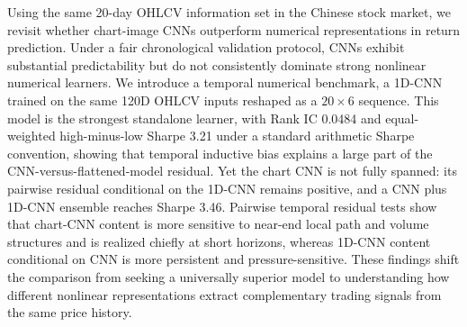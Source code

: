 Using the same 20-day OHLCV information set in the Chinese stock market, we revisit whether chart-image CNNs outperform numerical representations in return prediction. Under a fair chronological validation protocol, CNNs exhibit substantial predictability but do not consistently dominate strong nonlinear numerical learners. We introduce a temporal numerical benchmark, a 1D-CNN trained on the same 120D OHLCV inputs reshaped as a $20\times 6$ sequence. This model is the strongest standalone learner, with Rank IC 0.0484 and equal-weighted high-minus-low Sharpe 3.21 under a standard arithmetic Sharpe convention, showing that temporal inductive bias explains a large part of the CNN-versus-flattened-model residual. Yet the chart CNN is not fully spanned: its pairwise residual conditional on the 1D-CNN remains positive, and a CNN plus 1D-CNN ensemble reaches Sharpe 3.46. Pairwise temporal residual tests show that chart-CNN content is more sensitive to near-end local path and volume structures and is realized chiefly at short horizons, whereas 1D-CNN content conditional on CNN is more persistent and pressure-sensitive. These findings shift the comparison from seeking a universally superior model to understanding how different nonlinear representations extract complementary trading signals from the same price history.

